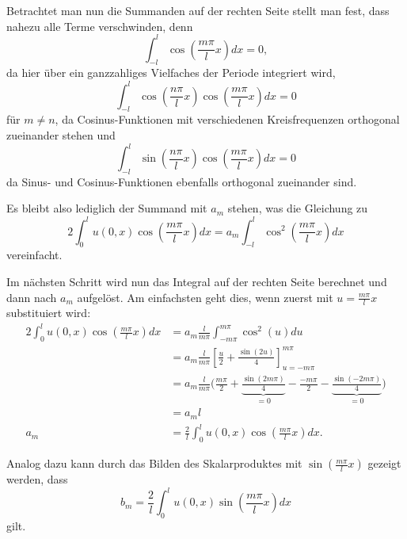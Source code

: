 Betrachtet man nun die Summanden auf der rechten Seite stellt man fest, dass
nahezu alle Terme verschwinden, denn
\[
    \int_{-l}^{l}\cos\left(\frac{m \pi}{l}x\right) dx
    =
    0,
\]
da hier über ein ganzzahliges Vielfaches der Periode integriert wird,
\[
    \int_{-l}^{l}\cos\left(\frac{n\pi}{l}x\right)
    \cos\left(\frac{m \pi}{l}x\right)dx
    =
    0
\]
für $m\neq n$, da Cosinus-Funktionen mit verschiedenen Kreisfrequenzen
orthogonal zueinander stehen und
\[
    \int_{-l}^{l}\sin\left(\frac{n\pi}{l}x\right)
        \cos\left(\frac{m \pi}{l}x\right)dx
    =
    0
\]
da Sinus- und Cosinus-Funktionen ebenfalls orthogonal zueinander sind.

Es bleibt also lediglich der Summand mit $a_m$ stehen, was die Gleichung zu
\[
    2\int_{0}^{l}u(0, x)\cos\left(\frac{m \pi}{l}x\right)dx
    =
    a_m\int_{-l}^{l}\cos^2\left(\frac{m\pi}{l}x\right)dx
\]
vereinfacht.

Im nächsten Schritt wird nun das Integral auf der rechten Seite
berechnet und dann nach $a_m$ aufgelöst.
Am einfachsten geht dies, wenn zuerst mit $u = \frac{m \pi}{l}x$ substituiert
wird:
\[
    \begin{aligned}
    2\int_{0}^{l}u(0, x)\cos\left(\frac{m \pi}{l}x\right)dx
    &=
    a_m\frac{l}{m\pi}\int_{-m\pi}^{m\pi}\cos^2\left(u\right)du
    \\
    &=
    a_m\frac{l}{m\pi}\left[\frac{u}{2} + 
    \frac{\sin\left(2u\right)}{4}\right]_{u=-m\pi}^{m\pi}
    \\
    &=
    a_m\frac{l}{m\pi}\biggl(\frac{m\pi}{2} + 
    \underbrace{\frac{\sin\left(2m\pi\right)}{4}}_{\displaystyle = 0} - 
    \frac{-m\pi}{2} -
    \underbrace{\frac{\sin\left(-2m\pi\right)}{4}}_{\displaystyle = 0}\biggr)
    \\
    &=
    a_m l
    \\
    a_m
    &=
    \frac{2}{l} \int_{0}^{l}u(0, x)\cos\left(\frac{m \pi}{l}x\right)dx.
    \end{aligned}
\]

Analog dazu kann durch das Bilden des Skalarproduktes mit 
$ \sin\left(\frac{m \pi}{l}x\right) $ gezeigt werden, dass
\[
    b_m
    =
    \frac{2}{l} \int_{0}^{l}u(0, x)\sin\left(\frac{m \pi}{l}x\right)dx
\]
gilt.


